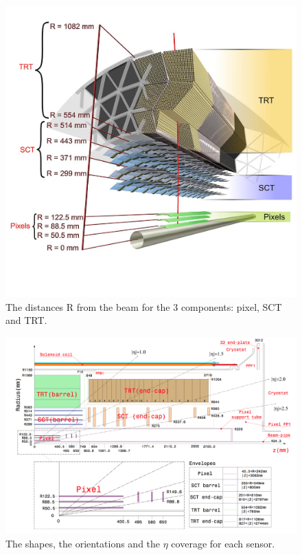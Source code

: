 \begin{figure}
\centering
\includegraphics[width=\textwidth]{data/photo/inner_detail.jpg}
\caption{The distances R from the beam for the 3 components: pixel, SCT and TRT. \cite{inner_photo}}
\label{fig:detector_inner_detail}
\end{figure}
\begin{figure}
\centering
\includegraphics[width=\textwidth]{data/photo/inner_size.png}
\caption{The shapes, the orientations and the $\eta$ coverage for each sensor. \cite{ATLAS_doc}}
\label{fig:detector_inner_size}
\end{figure}

